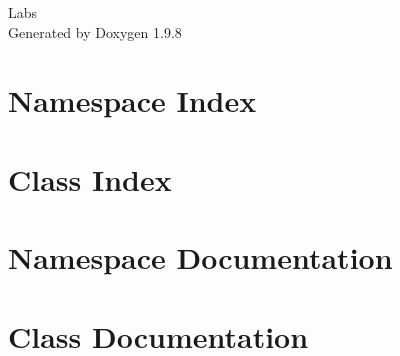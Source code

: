 \documentclass[twoside]{book}
\newcommand{\+}{\discretionary{\mbox{\scriptsize$\hookleftarrow$}}{}{}}
\newcommand{\clearemptydoublepage}{%
    \newpage{\pagestyle{empty}\cleardoublepage}%
  }
\begin{document}
  \raggedbottom
    \hypersetup{pageanchor=false,
                bookmarksnumbered=true,
                pdfencoding=unicode
               }
  \begin{titlepage}
  \vspace*{7cm}
  \begin{center}%
  {\Large Labs}\\
  \vspace*{1cm}
  {\large Generated by Doxygen 1.9.8}\\
  \end{center}
  \end{titlepage}
  \clearemptydoublepage
  \tableofcontents
  \clearemptydoublepage
  \hypersetup{pageanchor=true}
\chapter{Namespace Index}

\chapter{Class Index}

\chapter{Namespace Documentation}

\chapter{Class Documentation}







  \backmatter
  \newpage
  \clearemptydoublepage
  \printindex
\end{document}
